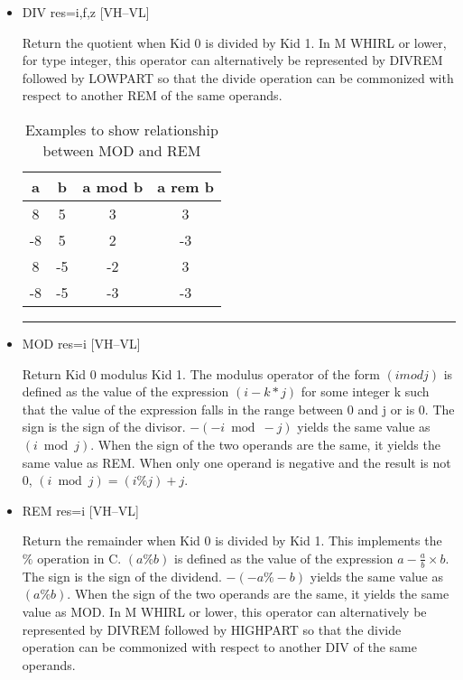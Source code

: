 \begin{itemize}
\item
{}%
DIV res=i,f,z \hfill [VH--VL]

Return the quotient when Kid 0 is divided by Kid 1. In M WHIRL
or lower, for type integer, this operator can alternatively be
represented by
%
DIVREM followed by
%
LOWPART so that the divide operation can be
commonized with respect to another
%
REM of the same operands.



\begin{table}
\begin{center}
\begin{tabular}{|c|c||c|c|}
\hline
a & b & a mod b & a rem b \\\hline\hline
8 &5 &3 &3 \\\hline
-8 &5 &2 &-3\\\hline
8 &-5 &-2 &3\\ \hline
-8 &-5 &-3 &-3\\
\hline
\end{tabular}
\end{center}
\hrule
\caption{Examples to show relationship between
%
MOD and
%
REM}
\end{table}

\item
{}%
MOD res=i \hfill [VH--VL]

Return Kid 0 modulus Kid 1. The modulus operator of the form $(i
mod j)$ is defined as the value of the expression $(i - k * j)$ for
some integer k such
that the value of the expression falls in the range between 0 and
j or is 0. The sign is the sign of the divisor. $-(-i \bmod -j)$ yields
the same value as $(i \bmod j)$. When the sign of the two operands are
the same, it yields the same value as
%
REM. When only one operand is negative and the result is not 0, $(i
\bmod j) = (i \% j) + j$.

\item
{}%
REM res=i \hfill [VH--VL]

Return the remainder when Kid 0 is divided by Kid 1. This implements the
$\%$ operation in C. $(a \% b)$ is defined as the value of the expression $a - \frac{a}{b}\times b$. The sign is the sign of the dividend. $-(-a \% -b)$ yields
the same value as $(a \% b)$. When the sign of the two operands are
the same, it yields the same value as
%
MOD. In M WHIRL or lower, this operator can alternatively be
represented by
%
DIVREM followed by
%
HIGHPART so that the divide operation can be
commonized with respect to another
%
DIV of the same operands.


\end{itemize}
